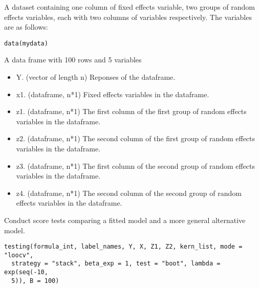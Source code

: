 \documentclass[a4paper]{book}
\begin{document}
%
\begin{Description}\relax
A dataset containing one column of fixed effects variable, two groups of
random effects variables, each with two columns of variables respectively. 
The variables are as follows:
\end{Description}
%
\begin{Usage}
\begin{verbatim}
data(mydata)
\end{verbatim}
\end{Usage}
%
\begin{Format}
A data frame with 100 rows and 5 variables
\end{Format}
%
\begin{Details}\relax
\begin{itemize}

\item Y. (vector of length n) Reponses of the dataframe.
\item x1. (dataframe, n*1) Fixed effects variables in the dataframe.
\item z1. (dataframe, n*1) The first column of the first group of random effects 
variables in the dataframe.
\item z2. (dataframe, n*1) The second column of the first group of random effects 
variables in the dataframe.
\item z3. (dataframe, n*1) The first column of the second group of random effects 
variables in the dataframe.
\item z4. (dataframe, n*1) The second column of the second group of random effects 
variables in the dataframe.

\end{itemize}

\end{Details}
%
\begin{Description}\relax
Conduct score tests comparing a fitted model and a more general alternative
model.
\end{Description}
%
\begin{Usage}
\begin{verbatim}
testing(formula_int, label_names, Y, X, Z1, Z2, kern_list, mode = "loocv",
  strategy = "stack", beta_exp = 1, test = "boot", lambda = exp(seq(-10,
  5)), B = 100)
\end{verbatim}
\end{Usage}
\end{document}
